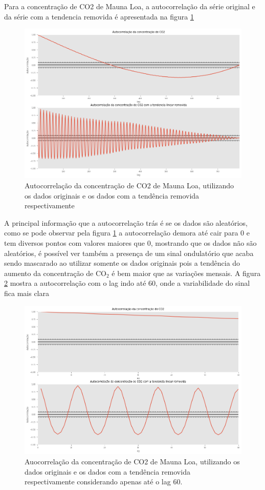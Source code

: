 \documentclass[12pt,a4paper,portuguese]{article}
\begin{document}
Para a concentração de CO2 de Mauna Loa, a autocorrelação da série original e da série com a tendencia removida é apresentada na figura \ref{fig:lista3-6a}
\begin{figure}[H]
	\centering
	\includegraphics[width=1\linewidth]{lista3-6a}
	\caption{Autocorrelação da concentração de CO2 de Mauna Loa, utilizando os dados originais e os dados com a tendência removida respectivamente}
	\label{fig:lista3-6a}
\end{figure}
A principal informação que a autocorrelação trás é se os dados são aleatórios, como se pode observar pela figura \ref{fig:lista3-6a} a autocorrelação demora até cair para 0 e tem diversos pontos com valores maiores que 0, mostrando que os dados não são aleatórios, é possível ver também a presença de um sinal ondulatório que acaba sendo mascarado ao utilizar somente os dados originais pois a tendência do aumento da concentração de CO$_2$ é bem maior que as variações mensais. A figura  \ref{fig:lista3-6a2} mostra a autocorrelação com o lag indo até 60, onde a variabilidade do sinal fica mais clara
\begin{figure}[H]
	\centering
	\includegraphics[width=1\linewidth]{lista3-6a2}
	\caption{Auocorrelação da concentração de CO2 de Mauna Loa, utilizando os dados originais e os dados com a tendência removida respectivamente considerando apenas até o lag 60.}
	\label{fig:lista3-6a2}
\end{figure}
\end{document}
